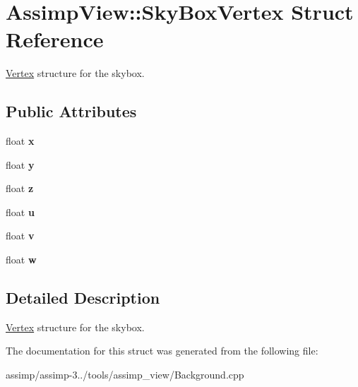 \hypertarget{struct_assimp_view_1_1_sky_box_vertex}{\section{Assimp\+View\+:\+:Sky\+Box\+Vertex Struct Reference}
\label{struct_assimp_view_1_1_sky_box_vertex}
}


\hyperlink{struct_vertex}{Vertex} structure for the skybox.  


\subsection*{Public Attributes}
\begin{DoxyCompactItemize}
\item 
\hypertarget{struct_assimp_view_1_1_sky_box_vertex_acfcc5a146c1f01f7a1b996d025c083a7}{float {\bfseries x}}\label{struct_assimp_view_1_1_sky_box_vertex_acfcc5a146c1f01f7a1b996d025c083a7}

\item 
\hypertarget{struct_assimp_view_1_1_sky_box_vertex_a9c94ef1f1e2ac8991233b627d2640579}{float {\bfseries y}}\label{struct_assimp_view_1_1_sky_box_vertex_a9c94ef1f1e2ac8991233b627d2640579}

\item 
\hypertarget{struct_assimp_view_1_1_sky_box_vertex_aca41693874d8ec6366e0830b0ae3494d}{float {\bfseries z}}\label{struct_assimp_view_1_1_sky_box_vertex_aca41693874d8ec6366e0830b0ae3494d}

\item 
\hypertarget{struct_assimp_view_1_1_sky_box_vertex_a0721a8a69e0ad7cb76cdae8d3d0785c3}{float {\bfseries u}}\label{struct_assimp_view_1_1_sky_box_vertex_a0721a8a69e0ad7cb76cdae8d3d0785c3}

\item 
\hypertarget{struct_assimp_view_1_1_sky_box_vertex_a8d99a57fa5a90631d678b304f2aeb0f0}{float {\bfseries v}}\label{struct_assimp_view_1_1_sky_box_vertex_a8d99a57fa5a90631d678b304f2aeb0f0}

\item 
\hypertarget{struct_assimp_view_1_1_sky_box_vertex_a608a36aa6357699998727311f42ee33e}{float {\bfseries w}}\label{struct_assimp_view_1_1_sky_box_vertex_a608a36aa6357699998727311f42ee33e}

\end{DoxyCompactItemize}


\subsection{Detailed Description}
\hyperlink{struct_vertex}{Vertex} structure for the skybox. 

The documentation for this struct was generated from the following file\+:\begin{DoxyCompactItemize}
\item 
assimp/assimp-\/3../tools/assimp\+\_\+view/Background.\+cpp\end{DoxyCompactItemize}
